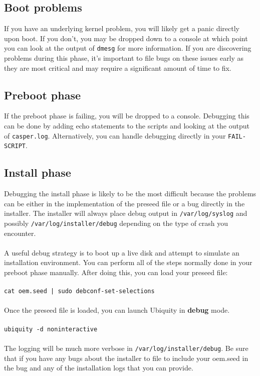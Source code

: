 \documentclass[letterpaper,10pt,titlepage]{article}
\begin{document}
\subsection{Boot problems}
If you have an underlying kernel problem, you will likely get a panic directly upon boot.  If you don't, you may be dropped down to a console at which point you can look at the output of \texttt{dmesg} for more information.  If you are discovering problems during this phase, it's important to file bugs on these issues early as they are most critical and may require a significant amount of time to fix.

\subsection{Preboot phase}
If the preboot phase is failing, you will be dropped to a console.  Debugging this can be done by adding echo statements to the scripts and looking at the output of \texttt{casper.log}.  Alternatively, you can handle debugging directly in your \texttt{FAIL-SCRIPT}.

\subsection{Install phase}
Debugging the install phase is likely to be the most difficult because the problems can be either in the implementation of the preseed file or a bug directly in the installer.  The installer will always place debug output in \texttt{/var/log/syslog} and possibly \texttt{/var/log/installer/debug} depending on the type of crash you encounter.
\\
\\
A useful debug strategy is to boot up a live disk and attempt to simulate an installation environment.  You can perform all of the steps normally done in your preboot phase manually.  After doing this, you can load your preseed file:
\\
\\
\texttt{cat oem.seed | sudo debconf-set-selections}
\\
\\
Once the preseed file is loaded, you can launch Ubiquity in \textbf{debug} mode.
\\
\\
\texttt{ubiquity -d noninteractive}
\\
\\
The logging will be much more verbose in \texttt{/var/log/installer/debug}.  Be sure that if you have any bugs about the installer to file to include your oem.seed in the bug and any of the installation logs that you can provide.
\end{document}

